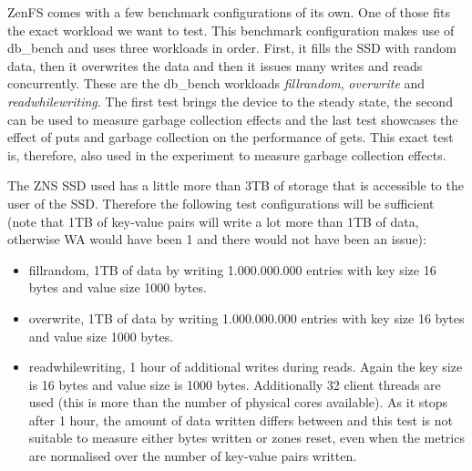 ZenFS comes with a few benchmark configurations of its own. One of those fits the exact workload we want to test. This benchmark configuration makes use of db\_bench and uses three workloads in order. First, it fills the SSD with random data, then it overwrites the data and then it issues many writes and reads concurrently. These are the db\_bench workloads \textit{fillrandom}, \textit{overwrite} and \textit{readwhilewriting}. The first test brings the device to the steady state, the second can be used to measure garbage collection effects and the last test showcases the effect of puts and garbage collection on the performance of gets. This exact test is, therefore, also used in the experiment to measure garbage collection effects.

The ZNS SSD used has a little more than 3TB of storage that is accessible to the user of the SSD. Therefore the following test configurations will be sufficient (note that 1TB of key-value pairs will write a lot more than 1TB of data, otherwise WA would have been 1 and there would not have been an issue):
\begin{itemize}
    \item fillrandom, 1TB of data by writing 1.000.000.000 entries with key size 16 bytes and value size 1000 bytes.
    \item overwrite, 1TB of data by writing 1.000.000.000 entries with key size 16 bytes and value size 1000 bytes.
    \item readwhilewriting, 1 hour of additional writes during reads. Again the key size is 16 bytes and value size is 1000 bytes. Additionally 32 client threads are used (this is more than the number of physical cores available). As it stops after 1 hour, the amount of data written differs between and this test is not suitable to measure either bytes written or zones reset, even when the metrics are normalised over the number of key-value pairs written. 
\end{itemize}

